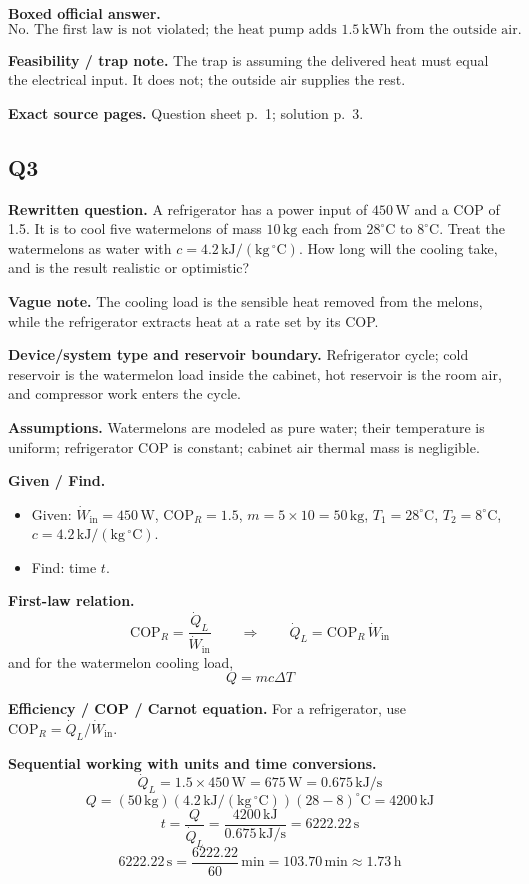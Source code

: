 \textbf{Boxed official answer.}
\[
\boxed{\text{No. The first law is not violated; the heat pump adds }1.5\,\text{kWh}\text{ from the outside air.}}
\]

\textbf{Feasibility / trap note.} The trap is assuming the delivered heat must equal the electrical input. It does not; the outside air supplies the rest.

\textbf{Exact source pages.} Question sheet p.~1; solution p.~3.

\subsection*{Q3}
\textbf{Rewritten question.} A refrigerator has a power input of $450\,\text{W}$ and a COP of 1.5. It is to cool five watermelons of mass $10\,\text{kg}$ each from $28^\circ\text{C}$ to $8^\circ\text{C}$. Treat the watermelons as water with $c=4.2\,\mathrm{kJ/(kg\,^{\circ}C)}$. How long will the cooling take, and is the result realistic or optimistic?

\textbf{Vague note.} The cooling load is the sensible heat removed from the melons, while the refrigerator extracts heat at a rate set by its COP.

\textbf{Device/system type and reservoir boundary.} Refrigerator cycle; cold reservoir is the watermelon load inside the cabinet, hot reservoir is the room air, and compressor work enters the cycle.

\textbf{Assumptions.} Watermelons are modeled as pure water; their temperature is uniform; refrigerator COP is constant; cabinet air thermal mass is negligible.

\textbf{Given / Find.}
\begin{itemize}
  \item Given: $\dot W_{\text{in}}=450\,\text{W}$, $\mathrm{COP}_R=1.5$, $m=5\times 10=50\,\text{kg}$, $T_1=28^\circ\text{C}$, $T_2=8^\circ\text{C}$, $c=4.2\,\mathrm{kJ/(kg\,^{\circ}C)}$.
  \item Find: time $t$.
\end{itemize}

\textbf{First-law relation.}
\[
\mathrm{COP}_R = \frac{\dot Q_L}{\dot W_{\text{in}}}
\qquad\Rightarrow\qquad
\dot Q_L = \mathrm{COP}_R\,\dot W_{\text{in}}
\]
and for the watermelon cooling load,
\[
Q = mc\Delta T
\]

\textbf{Efficiency / COP / Carnot equation.} For a refrigerator, use $\mathrm{COP}_R=\dot Q_L/\dot W_{\text{in}}$.

\textbf{Sequential working with units and time conversions.}
\[
\dot Q_L = 1.5\times 450\,\text{W} = 675\,\text{W} = 0.675\,\text{kJ/s}
\]
\[
Q = (50\,\text{kg})(4.2\,\mathrm{kJ/(kg\,^{\circ}C)})(28-8)^\circ\text{C}
= 4200\,\text{kJ}
\]
\[
t = \frac{Q}{\dot Q_L} = \frac{4200\,\text{kJ}}{0.675\,\text{kJ/s}} = 6222.22\,\text{s}
\]
\[
6222.22\,\text{s} = \frac{6222.22}{60}\,\text{min} = 103.70\,\text{min} \approx 1.73\,\text{h}
\]

